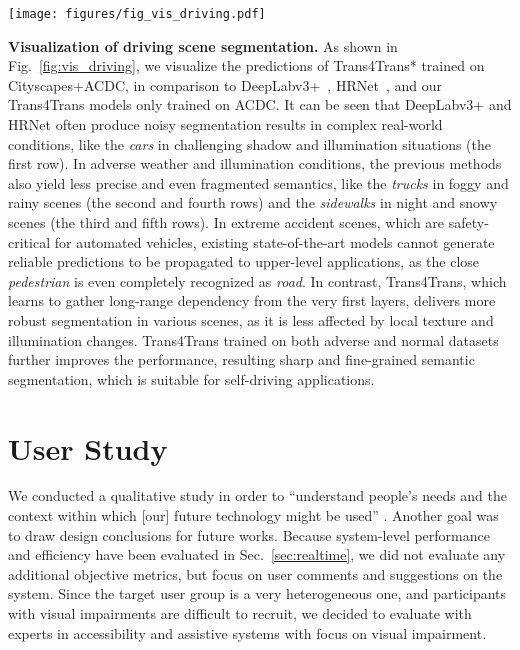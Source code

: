 \documentclass[journal]{IEEEtran}
\begin{document}
\begin{figure*}[!t]
    \centering
    \texttt{[image: figures/fig\_vis\_driving.pdf]}
\caption{\small Qualitative analysis on Cityscapes~\cite{cityscapes} (\emph{Normal}), ACDC~\cite{sakaridis2021acdc} (\emph{Fog, Night, Rain}, and \emph{Snow}), and DADA-seg~\cite{zhang2021issafe} (\emph{Accidental}). The Trans4Trans* is trained on ACDC+Cityscapes, whereas other models are trained on ACDC dataset. 
    }
    \label{fig:vis_driving}
\end{figure*}

\noindent\textbf{Visualization of driving scene segmentation.}
As shown in Fig.~\ref{fig:vis_driving}, we visualize the predictions of Trans4Trans* trained on Cityscapes+ACDC, in comparison to DeepLabv3+~\cite{deeplabv3+}, HRNet~\cite{hrnet}, and our Trans4Trans models only trained on ACDC. It can be seen that DeepLabv3+ and HRNet often produce noisy segmentation results in complex real-world conditions, like the \emph{cars} in challenging shadow and illumination situations (the first row). In adverse weather and illumination conditions, the previous methods also yield less precise and even fragmented semantics, like the \emph{trucks} in foggy and rainy scenes (the second and fourth rows) and the \emph{sidewalks} in night and snowy scenes (the third and fifth rows). In extreme accident scenes, which are safety-critical for automated vehicles, existing state-of-the-art models cannot generate reliable predictions to be propagated to upper-level applications, as the close \emph{pedestrian} is even completely recognized as \emph{road}. In contrast, Trans4Trans, which learns to gather long-range dependency from the very first layers, delivers more robust segmentation in various scenes, as it is less affected by local texture and illumination changes. Trans4Trans trained on both adverse and normal datasets further improves the performance, resulting sharp and fine-grained semantic segmentation, which is suitable for self-driving applications. 


\section{User Study}
We conducted a qualitative study in order to ``understand people's needs and the context within which [our] future technology might be used'' \cite{Blandford2016_qualitative}. Another goal was to draw design conclusions for future works.
Because system-level performance and efficiency have been evaluated in Sec.~\ref{sec:realtime}, we did not evaluate any additional objective metrics, but focus on user comments and suggestions on the system.
Since the target user group is a very heterogeneous one, and participants with visual impairments are difficult to recruit, we decided to evaluate with experts in accessibility and assistive systems with focus on visual impairment.
\end{document}
